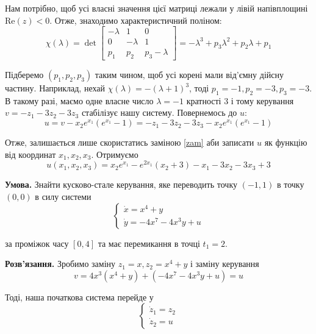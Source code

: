 \documentclass[oneside,solution]{karazin-control-assign}
\begin{document}
Нам потрібно, щоб усі власні значення цієї матриці лежали у лівій напівплощині $\text{Re}(z) < 0$. Отже, знаходимо характеристичний поліном:
\begin{equation}
    \chi(\lambda) = \det\begin{bmatrix}
        -\lambda & 1 & 0 \\
        0 & -\lambda & 1 \\
        p_1 & p_2 & p_3-\lambda
    \end{bmatrix} = -\lambda^3 + p_3\lambda^2 + p_2\lambda + p_1
\end{equation}

Підберемо $(p_1,p_2,p_3)$ таким чином, щоб усі корені мали від'ємну дійсну частину. Наприклад, нехай $\chi(\lambda)=-(\lambda+1)^3$, тоді $p_1=-1,p_2=-3,p_3=-3$. В такому разі, маємо одне власне число $\lambda=-1$ кратності 3 і тому керування $v=-z_1-3z_2-3z_3$ стабілізує нашу систему. Повернемось до $u$:
\begin{equation}
    u = v - x_2e^{x_1}(e^{x_1}-1) = -z_1-3z_2-3z_3 - x_2e^{x_1}(e^{x_1}-1)
\end{equation}

Отже, залишається лише скористатись заміною \ref{zam} аби записати $u$ як функцію від координат $x_1,x_2,x_3$. Отримуємо
\begin{equation}
    \boxed{u(x_1,x_2,x_3) = x_2e^{x_1} - e^{2x_1}(x_2+3) - x_1 - 3x_2 - 3x_3 + 3}
\end{equation}


\hspace{20px}\textbf{Умова.} Знайти кусково-стале керування, яке переводить точку $(-1,1)$ в точку $(0,0)$ в силу системи
\begin{equation}
    \begin{cases}
        \dot{x} = x^4 + y \\
        \dot{y} = -4x^7 - 4x^3y + u
    \end{cases}
\end{equation}

за проміжок часу $[0,4]$ та має перемикання в точці $t_1=2$.

\textbf{Розв'язання.} Зробимо заміну $z_1=x, z_2=x^4+y$ і заміну керування
\begin{equation}
    v = 4x^3(x^4+y) + (-4x^7 - 4x^3y + u) = u
\end{equation}

Тоді, наша початкова система перейде у
\begin{equation}\label{eq:2_1}
    \begin{cases}
        \dot{z}_1 = z_2 \\
        \dot{z}_2 = u
    \end{cases}
\end{equation}
\end{document}
